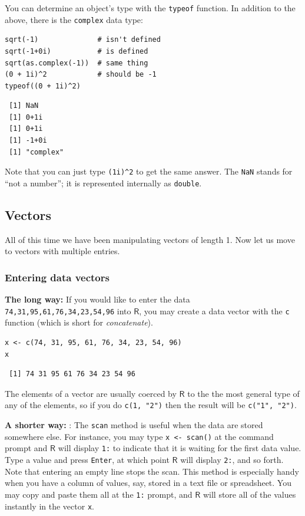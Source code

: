 \documentclass[captions=tableheading]{scrbook}
\begin{document}
You can determine an object's type with the \texttt{typeof} function. In addition to the above, there is the \texttt{complex} data type:


\begin{verbatim}
sqrt(-1)              # isn't defined
sqrt(-1+0i)           # is defined
sqrt(as.complex(-1))  # same thing
(0 + 1i)^2            # should be -1
typeof((0 + 1i)^2)
\end{verbatim}

\begin{verbatim}
 [1] NaN
 [1] 0+1i
 [1] 0+1i
 [1] -1+0i
 [1] "complex"
\end{verbatim}

Note that you can just type \texttt{(1i)\textasciicircum{}2} to get the same answer. The \texttt{NaN} stands for ``not a number''; it is represented internally as \texttt{double}. 
\subsection{Vectors}
\label{sec-2-3-3}
\label{sub-Vectors}


All of this time we have been manipulating vectors of length 1. Now let us move to vectors with multiple entries.
\subsubsection{Entering data vectors}
\label{sec-2-3-3-1}


\textbf{The long way:} If you would like to enter the data \texttt{74,31,95,61,76,34,23,54,96} into \(\mathsf{R}\), you may create a data vector with the \texttt{c} function (which is short for \emph{concatenate}).


\begin{verbatim}
x <- c(74, 31, 95, 61, 76, 34, 23, 54, 96)
x
\end{verbatim}

\begin{verbatim}
 [1] 74 31 95 61 76 34 23 54 96
\end{verbatim}

The elements of a vector are usually coerced by \(\mathsf{R}\) to the the most general type of any of the elements, so if you do \texttt{c(1, "2")} then the result will be \texttt{c("1", "2")}.

\textbf{A shorter way:} : The \texttt{scan} method is useful when the data are stored somewhere else. For instance, you may type \texttt{x <- scan()} at the command prompt and \(\mathsf{R}\) will display \texttt{1:} to indicate that it is waiting for the first data value. Type a value and press \texttt{Enter}, at which point \(\mathsf{R}\) will display \texttt{2:}, and so forth. Note that entering an empty line stops the scan. This method is especially handy when you have a column of values, say, stored in a text file or spreadsheet. You may copy and paste them all at the \texttt{1:} prompt, and \(\mathsf{R}\) will store all of the values instantly in the vector \texttt{x}. 
\end{document}
